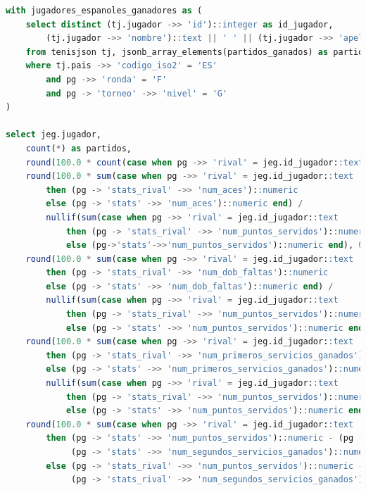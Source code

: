 \documentclass[10pt]{opticajnl}
\begin{document}
\begin{lstlisting}[language=SQL]
with jugadores_espanoles_ganadores as (
    select distinct (tj.jugador ->> 'id')::integer as id_jugador, 
    	(tj.jugador ->> 'nombre')::text || ' ' || (tj.jugador ->> 'apellido')::text as jugador
    from tenisjson tj, jsonb_array_elements(partidos_ganados) as partidos(pg)
    where tj.pais ->> 'codigo_iso2' = 'ES'
        and pg ->> 'ronda' = 'F'
        and pg -> 'torneo' ->> 'nivel' = 'G'
)

select jeg.jugador,
    count(*) as partidos,
    round(100.0 * count(case when pg ->> 'rival' = jeg.id_jugador::text then null else 1 end)::numeric / count(*), 1) as pcje_victorias,
    round(100.0 * sum(case when pg ->> 'rival' = jeg.id_jugador::text 
    	then (pg -> 'stats_rival' ->> 'num_aces')::numeric 
    	else (pg -> 'stats' ->> 'num_aces')::numeric end) / 
    	nullif(sum(case when pg ->> 'rival' = jeg.id_jugador::text 
    		then (pg -> 'stats_rival' ->> 'num_puntos_servidos')::numeric 
    		else (pg->'stats'->>'num_puntos_servidos')::numeric end), 0), 1) as pcje_aces,
    round(100.0 * sum(case when pg ->> 'rival' = jeg.id_jugador::text 
    	then (pg -> 'stats_rival' ->> 'num_dob_faltas')::numeric 
    	else (pg -> 'stats' ->> 'num_dob_faltas')::numeric end) / 
    	nullif(sum(case when pg ->> 'rival' = jeg.id_jugador::text 
    		then (pg -> 'stats_rival' ->> 'num_puntos_servidos')::numeric 
    		else (pg -> 'stats' ->> 'num_puntos_servidos')::numeric end), 0), 1) as pcje_dobles_faltas,
    round(100.0 * sum(case when pg ->> 'rival' = jeg.id_jugador::text 
    	then (pg -> 'stats_rival' ->> 'num_primeros_servicios_ganados')::numeric + (pg -> 'stats_rival' ->> 'num_segundos_servicios_ganados')::numeric 
    	else (pg -> 'stats' ->> 'num_primeros_servicios_ganados')::numeric + (pg -> 'stats' ->> 'num_segundos_servicios_ganados')::numeric end) / 
    	nullif(sum(case when pg ->> 'rival' = jeg.id_jugador::text 
    		then (pg -> 'stats_rival' ->> 'num_puntos_servidos')::numeric 
    		else (pg -> 'stats' ->> 'num_puntos_servidos')::numeric end), 0), 1) as pcje_servicios_ganados,
    round(100.0 * sum(case when pg ->> 'rival' = jeg.id_jugador::text 
    	then (pg -> 'stats' ->> 'num_puntos_servidos')::numeric - (pg -> 'stats' ->> 'num_primeros_servicios_ganados')::numeric - 
    		 (pg -> 'stats' ->> 'num_segundos_servicios_ganados')::numeric 
    	else (pg -> 'stats_rival' ->> 'num_puntos_servidos')::numeric - (pg -> 'stats_rival' ->> 'num_primeros_servicios_ganados')::numeric - 
    		 (pg -> 'stats_rival' ->> 'num_segundos_servicios_ganados')::numeric end) / 	

\end{lstlisting}
\end{document}
